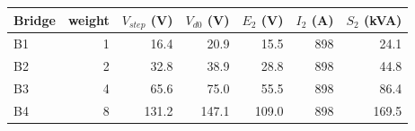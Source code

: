 \begin{tabular}{lrrrrrr}
\toprule
Bridge & weight & $V_{step}$ (V) & $V_{d0}$ (V) & $E_{2}$ (V) & $I_{2}$ (A) & $S_{2}$ (kVA)\\
\midrule
B1 & 1 & 16.4 & 20.9 & 15.5 & 898 & 24.1\\
B2 & 2 & 32.8 & 38.9 & 28.8 & 898 & 44.8\\
B3 & 4 & 65.6 & 75.0 & 55.5 & 898 & 86.4\\
B4 & 8 & 131.2 & 147.1 & 109.0 & 898 & 169.5\\
\bottomrule
\end{tabular}
